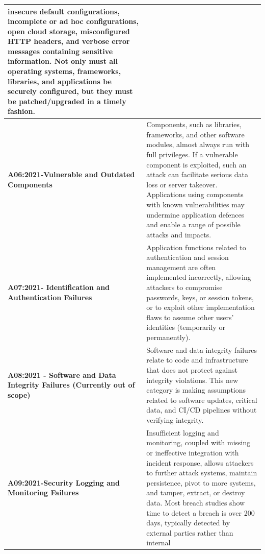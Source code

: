 \documentclass{article}
\begin{document}
\begin{center}
\begin{longtable} {|p{9em}|p{30em}|}
                insecure default configurations, incomplete or ad hoc configurations, open cloud storage,
                misconfigured HTTP headers, and verbose error messages containing sensitive
                information. Not only must all operating systems, frameworks, libraries, and applications
                be securely configured, but they must be patched/upgraded in a timely fashion. \\
                \hline
                \normalsize \textbf{A06:2021-Vulnerable and Outdated Components} & 
                \normalsize Components, such as libraries, frameworks, and other software modules, almost always
                run with full privileges. If a vulnerable component is exploited, such an attack can facilitate
                serious data loss or server takeover. Applications using components with known
                vulnerabilities may undermine application defences and enable a range of possible attacks
                and impacts. \\
                \hline
                \normalsize \textbf{A07:2021- Identification and Authentication Failures} & 
                \normalsize Application functions related to authentication and session management are often
                implemented incorrectly, allowing attackers to compromise passwords, keys, or session
                tokens, or to exploit other implementation flaws to assume other users' identities
                (temporarily or permanently). \\
                \hline
                \normalsize \textbf{A08:2021 - Software and Data Integrity Failures (Currently out of scope)} & 
                \normalsize Software and data integrity failures relate to code and infrastructure that does not protect
                against integrity violations. This new category is making assumptions related to software
                updates, critical data, and CI/CD pipelines without verifying integrity. \\
                \hline
                \normalsize \textbf{A09:2021-Security Logging and Monitoring Failures} & 
                \normalsize Insufficient logging and monitoring, coupled with missing or ineffective integration with
                incident response, allows attackers to further attack systems, maintain persistence, pivot
                to more systems, and tamper, extract, or destroy data. Most breach studies show time to
                detect a breach is over 200 days, typically detected by external parties rather than internal

\end{longtable}
\end{center}
\end{document}
